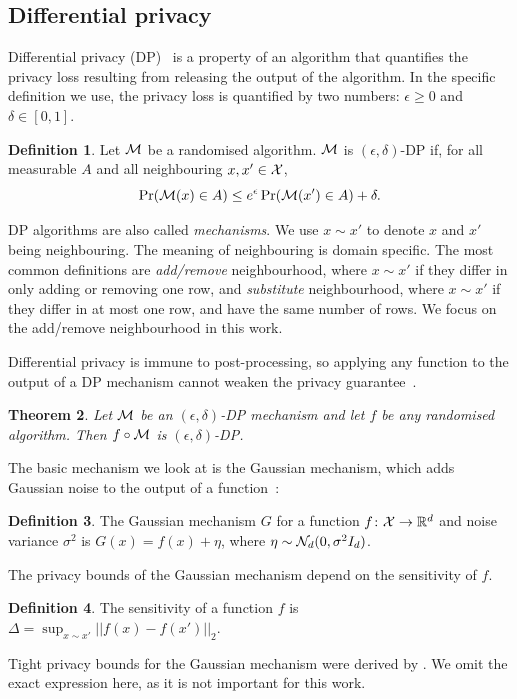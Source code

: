 \documentclass{article}
\theoremstyle{plain}
\newtheorem{theorem}{Theorem}[section]
\theoremstyle{definition}
\newtheorem{definition}[theorem]{Definition}
\theoremstyle{remark}
\begin{document}
\subsection{Differential privacy}\label{sec:dp-basics}
Differential privacy 
(DP)~\citep{dworkCalibratingNoiseSensitivity2006,dworkAlgorithmicFoundationsDifferential2014} 
is a property of an algorithm that quantifies 
the privacy loss resulting from releasing the output of the algorithm.
In the specific definition we use, the privacy loss is quantified by 
two numbers: $\epsilon \geq 0$ and $\delta \in [0, 1]$.
\begin{definition}
    Let $\mathcal{M}$ be a randomised algorithm. $\mathcal{M}$ is $(\epsilon, \delta)$-DP 
    if, for all measurable $A$ and all neighbouring $x, x'\in \mathcal{X}$,
    \begin{equation}
        \Pr(\mathcal{M}(x) \in A) \leq e^\epsilon \Pr(\mathcal{M}(x') \in A) + \delta.
    \end{equation}
\end{definition}
DP algorithms are also called \emph{mechanisms}. We use $x\sim x'$ to denote 
$x$ and $x'$ being neighbouring. The meaning of neighbouring
is domain specific. The most common definitions are \emph{add/remove}
neighbourhood, where $x\sim x'$ if they differ in only 
adding or removing one row, and \emph{substitute} neighbourhood, where 
$x\sim x'$ if they differ in at most one row, and have 
the same number of rows. We focus on the add/remove neighbourhood in this 
work.

Differential privacy is immune to post-processing, so applying any 
function to the output of a DP mechanism cannot weaken the privacy 
guarantee~\citep{dworkAlgorithmicFoundationsDifferential2014}.
\begin{theorem}\label{thm:dp-post-processing-immunity}
    Let $\mathcal{M}$ be an $(\epsilon, \delta)$-DP mechanism and let $f$ be 
    any randomised algorithm. Then $f\circ \mathcal{M}$ is $(\epsilon, \delta)$-DP.
\end{theorem}

The basic mechanism we look at is the Gaussian mechanism, which 
adds Gaussian noise to the output of a function~\citep{dworkOurDataOurselves2006}:
\begin{definition}\label{def:gaussian-mech}
    The Gaussian mechanism $G$ for a function $f\colon \mathcal{X} \to \mathbb{R}^d$ 
    and noise variance $\sigma^2$
    is $G(x) = f(x) + \eta$, where $\eta \sim \mathcal{N}_d(0, \sigma^2I_d)$.
\end{definition}
The privacy bounds of the Gaussian mechanism depend on the sensitivity
of $f$.
\begin{definition}\label{def:sensitivity}
    The sensitivity of a function $f$ is $\Delta = \sup_{x\sim x'}||f(x) - f(x')||_2$.
\end{definition}
Tight privacy bounds for the Gaussian mechanism were derived by 
\citet{balleImprovingGaussianMechanism2018}. We omit the exact expression here,
as it is not important for this work.
\end{document}
